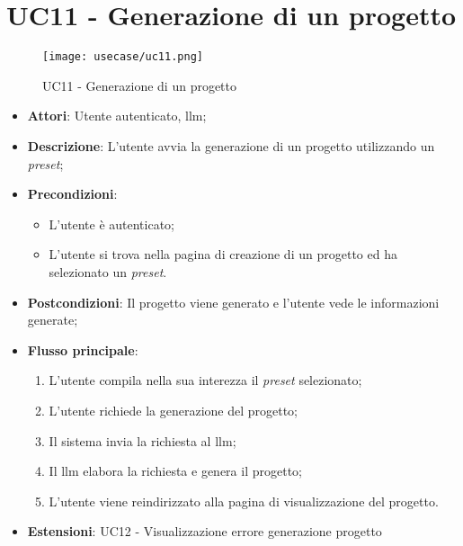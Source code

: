 \section*{UC11 - Generazione di un progetto}
\begin{figure}[H]
    \centering
    \texttt{[image: usecase/uc11.png]}
    \caption{UC11 - Generazione di un progetto}
    \label{fig:uc11}
\end{figure}
\begin{itemize}
    \item \textbf{Attori}: Utente autenticato, \gls{llm};
    \item \textbf{Descrizione}: L'utente avvia la generazione di un progetto utilizzando un \textit{preset};
    \item \textbf{Precondizioni}: 
    \begin{itemize}
        \item L'utente è autenticato;
        \item L'utente si trova nella pagina di creazione di un progetto ed ha selezionato un \textit{preset}.
    \end{itemize}
    \item \textbf{Postcondizioni}: Il progetto viene generato e l'utente vede le informazioni generate;
    \item \textbf{Flusso principale}:
    \begin{enumerate}
        \item L'utente compila nella sua interezza il \textit{preset} selezionato;
        \item L'utente richiede la generazione del progetto;
        \item Il sistema invia la richiesta al \gls{llm};
        \item Il \gls{llm} elabora la richiesta e genera il progetto;
        \item L'utente viene reindirizzato alla pagina di visualizzazione del progetto.
    \end{enumerate}
    \item \textbf{Estensioni}: UC12 - Visualizzazione errore generazione progetto
\end{itemize}


\vspace{0.5cm}  
